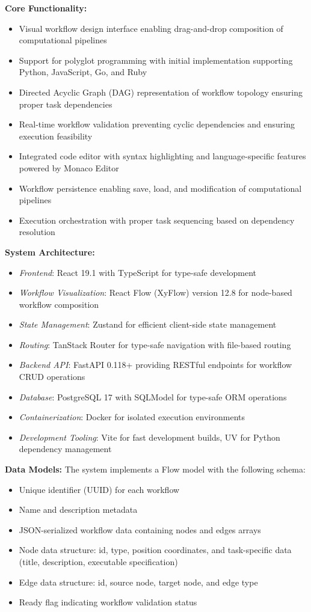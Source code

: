 \documentclass[12pt]{article}
\begin{document}
\textbf{Core Functionality:}
\begin{itemize}
    \item Visual workflow design interface enabling drag-and-drop composition of computational pipelines
    \item Support for polyglot programming with initial implementation supporting Python, JavaScript, Go, and Ruby
    \item Directed Acyclic Graph (DAG) representation of workflow topology ensuring proper task dependencies
    \item Real-time workflow validation preventing cyclic dependencies and ensuring execution feasibility
    \item Integrated code editor with syntax highlighting and language-specific features powered by Monaco Editor
    \item Workflow persistence enabling save, load, and modification of computational pipelines
    \item Execution orchestration with proper task sequencing based on dependency resolution
\end{itemize}

\textbf{System Architecture:}
\begin{itemize}
    \item \textit{Frontend}: React 19.1 with TypeScript for type-safe development
    \item \textit{Workflow Visualization}: React Flow (XyFlow) version 12.8 for node-based workflow composition
    \item \textit{State Management}: Zustand for efficient client-side state management
    \item \textit{Routing}: TanStack Router for type-safe navigation with file-based routing
    \item \textit{Backend API}: FastAPI 0.118+ providing RESTful endpoints for workflow CRUD operations
    \item \textit{Database}: PostgreSQL 17 with SQLModel for type-safe ORM operations
    \item \textit{Containerization}: Docker for isolated execution environments
    \item \textit{Development Tooling}: Vite for fast development builds, UV for Python dependency management
\end{itemize}

\textbf{Data Models:}
The system implements a Flow model with the following schema:
\begin{itemize}
    \item Unique identifier (UUID) for each workflow
    \item Name and description metadata
    \item JSON-serialized workflow data containing nodes and edges arrays
    \item Node data structure: id, type, position coordinates, and task-specific data (title, description, executable specification)
    \item Edge data structure: id, source node, target node, and edge type
    \item Ready flag indicating workflow validation status
\end{itemize}
\end{document}
